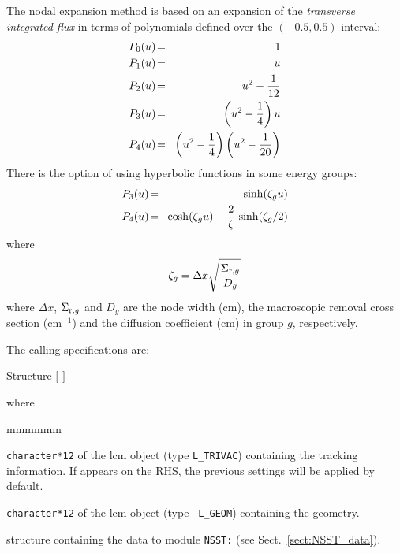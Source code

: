 The nodal expansion method is based on an expansion of the {\sl transverse integrated flux} in terms of polynomials defined
over the $(-0.5,0.5)$ interval:
\begin{eqnarray}
\nonumber P_0(u)\negthinspace &=&\negthinspace 1\\
\nonumber P_1(u)\negthinspace &=&\negthinspace u\\
\nonumber P_2(u)\negthinspace &=&\negthinspace u^2-{1\over 12}\\
\nonumber P_3(u)\negthinspace &=&\negthinspace \left( u^2-{1\over 4}\right)u\\
P_4(u)\negthinspace &=&\negthinspace \left( u^2-{1\over 4}\right)\left( u^2-{1\over 20}\right)
\label{eq:nem1}
\end{eqnarray}
There is the option of using hyperbolic functions in some energy groups:
\begin{eqnarray}
\nonumber P_3(u)\negthinspace &=&\negthinspace \sinh(\zeta_g u)\\
P_4(u)\negthinspace &=&\negthinspace \cosh(\zeta_g u)-{2\over \zeta}\, \sinh(\zeta_g/2)
\label{eq:nem2}
\end{eqnarray}
\noindent where
\begin{equation}
\zeta_g=\Delta x\sqrt{\Sigma_{{\rm r},g} \over D_g}
\end{equation}
\noindent where $\Delta x$, $\Sigma_{{\rm r},g}$ and $D_g$ are the node width (cm), the macroscopic removal cross section (cm$^{-1}$)
and the diffusion coefficient (cm) in group $g$, respectively.

\vskip 0.08cm

The calling specifications are:

\begin{DataStructure}{Structure }
 \moc{:=}  $[$  $]$   \moc{::} 
\end{DataStructure}

\goodbreak
\noindent where
\begin{ListeDeDescription}{mmmmmm}

\item[\dusa{TRACK}] {\tt character*12} of the {\sc lcm} object (type {\tt L\_TRIVAC}) 
containing the {\sc tracking} information. If  appears on the RHS, the
previous settings will be applied by default.

\item[\dusa{GEOM}] {\tt character*12} of the {\sc lcm} object (type {\tt
L\_GEOM}) containing the geometry.

\item[\dstr{NSST\_data}] structure containing the data to module {\tt NSST:} (see Sect.~\ref{sect:NSST_data}).

\end{ListeDeDescription}

